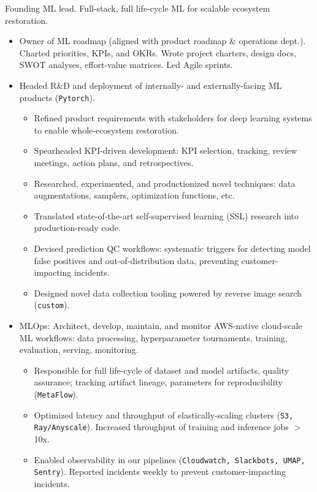 \documentclass[a4paper,12pt]{article}
\begin{document}
    \vspace{-6pt} Founding ML lead. Full-stack, full life-cycle ML for scalable ecosystem restoration.
    \begin{itemize}
        \item Owner of ML roadmap (aligned with product roadmap \& operations dept.). Charted priorities, KPIs, and OKRs. Wrote project charters, design docs, SWOT analyses, effort-value matrices. Led Agile sprints.
        \item Headed R\&D and deployment of internally- and externally-facing ML products (\texttt{Pytorch}).
        \begin{itemize}
            \item Refined product requirements with stakeholders for deep learning systems to enable whole-ecosystem restoration.
            \item Spearheaded KPI-driven development: KPI selection, tracking, review meetings, action plans, and retrospectives.
            \item Researched, experimented, and productionized novel techniques: data augmentations, samplers, optimization functions, etc.
            \item Translated state-of-the-art self-supervised learning (SSL) research into production-ready code.
            \item Devised prediction QC workflows: systematic triggers for detecting model false positives and out-of-distribution data, preventing customer-impacting incidents.
            \item Designed novel data collection tooling powered by reverse image search (\texttt{custom}).
        \end{itemize}
        \item MLOps: Architect, develop, maintain, and monitor AWS-native cloud-scale ML workflows: data processing, hyperparameter tournaments, training, evaluation, serving, monitoring.
        \begin{itemize}
            \item Responsible for full life-cycle of dataset and model artifacts, quality assurance;
            tracking artifact lineage, parameters for reproducibility (\texttt{MetaFlow}).
            \item Optimized latency and throughput of elastically-scaling clusters (\texttt{S3, Ray/Anyscale}). Increased throughput of training and inference jobs $>$10x.
            \item Enabled observability in our pipelines (\texttt{Cloudwatch, Slackbots, UMAP, Sentry}). Reported incidents weekly to prevent customer-impacting incidents.

\end{itemize}
\end{itemize}
\end{document}
